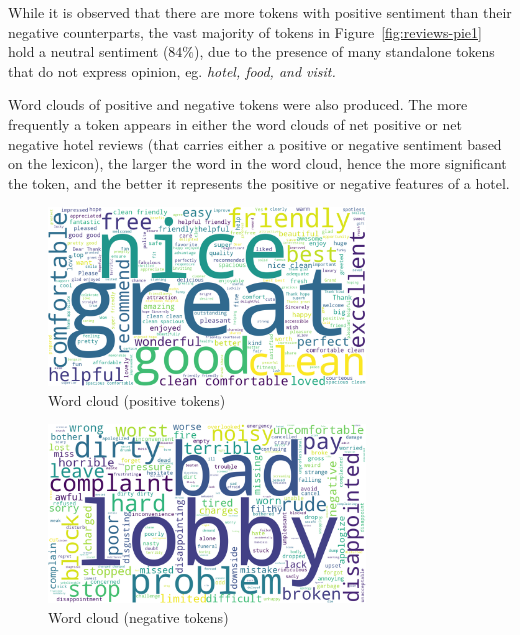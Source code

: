 \documentclass[12pt,bibliography=totocnumbered]{scrartcl}
\begin{document}
While it is observed that there are more tokens with positive sentiment than
their negative counterparts, the vast majority of tokens in
Figure~\ref{fig:reviews-pie1} hold a neutral sentiment ($84\%$),
due to the presence of many standalone tokens that do not express opinion,
eg. \it{hotel}, \it{food}, and \it{visit}.

Word clouds of positive and negative tokens were also produced.
The more frequently a token appears in either the word clouds of
net positive or net negative hotel reviews (that carries either a positive
or negative sentiment based on the lexicon), the larger the word in the word cloud,
hence the more significant the token, and the better it represents the positive
or negative features of a hotel.

\begin{figure}[htpb]
	\begin{center}
		\includegraphics[width=0.75\textwidth]{../results/rq1/wordcloud_pos.png}
	\end{center}
	\caption{Word cloud (positive tokens)}
	\label{fig:wordcloud-pos}
\end{figure}

\begin{figure}[htpb]
	\begin{center}
		\includegraphics[width=0.75\textwidth]{../results/rq1/wordcloud_neg.png}
	\end{center}
	\caption{Word cloud (negative tokens)}
	\label{fig:wordcloud-neg}
\end{figure}
\end{document}
